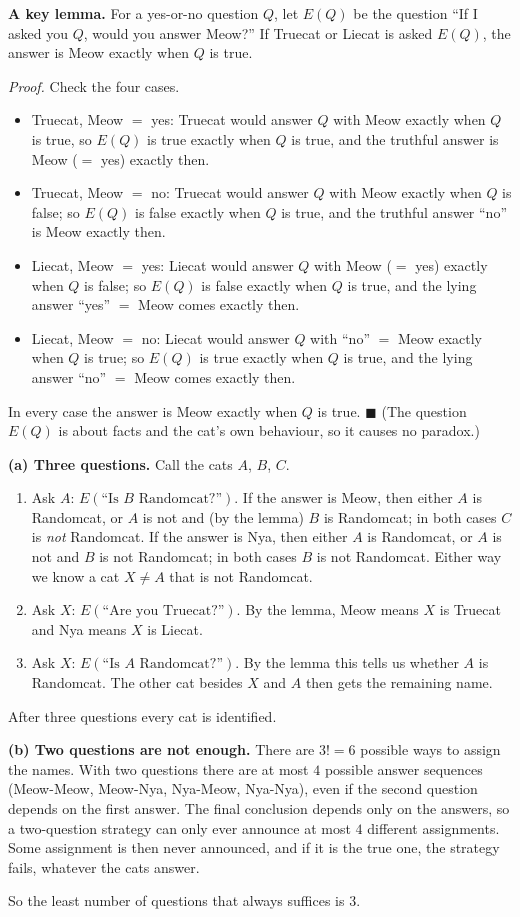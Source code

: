 \textbf{A key lemma.} For a yes-or-no question $Q$, let $E(Q)$ be the question ``If I asked you $Q$, would you answer Meow?'' If Truecat or Liecat is asked $E(Q)$, the answer is Meow exactly when $Q$ is true.

\emph{Proof.} Check the four cases.
\begin{itemize}
\item Truecat, Meow $=$ yes: Truecat would answer $Q$ with Meow exactly when $Q$ is true, so $E(Q)$ is true exactly when $Q$ is true, and the truthful answer is Meow ($=$ yes) exactly then.
\item Truecat, Meow $=$ no: Truecat would answer $Q$ with Meow exactly when $Q$ is false; so $E(Q)$ is false exactly when $Q$ is true, and the truthful answer ``no'' is Meow exactly then.
\item Liecat, Meow $=$ yes: Liecat would answer $Q$ with Meow ($=$ yes) exactly when $Q$ is false; so $E(Q)$ is false exactly when $Q$ is true, and the lying answer ``yes'' $=$ Meow comes exactly then.
\item Liecat, Meow $=$ no: Liecat would answer $Q$ with ``no'' $=$ Meow exactly when $Q$ is true; so $E(Q)$ is true exactly when $Q$ is true, and the lying answer ``no'' $=$ Meow comes exactly then.
\end{itemize}
In every case the answer is Meow exactly when $Q$ is true. $\blacksquare$ (The question $E(Q)$ is about facts and the cat's own behaviour, so it causes no paradox.)

\textbf{(a) Three questions.} Call the cats $A$, $B$, $C$.
\begin{enumerate}
\item Ask $A$: $E(\text{``Is }B\text{ Randomcat?''})$. If the answer is Meow, then either $A$ is Randomcat, or $A$ is not and (by the lemma) $B$ is Randomcat; in both cases $C$ is \emph{not} Randomcat. If the answer is Nya, then either $A$ is Randomcat, or $A$ is not and $B$ is not Randomcat; in both cases $B$ is not Randomcat. Either way we know a cat $X\ne A$ that is not Randomcat.
\item Ask $X$: $E(\text{``Are you Truecat?''})$. By the lemma, Meow means $X$ is Truecat and Nya means $X$ is Liecat.
\item Ask $X$: $E(\text{``Is }A\text{ Randomcat?''})$. By the lemma this tells us whether $A$ is Randomcat. The other cat besides $X$ and $A$ then gets the remaining name.
\end{enumerate}
After three questions every cat is identified.

\textbf{(b) Two questions are not enough.} There are $3!=6$ possible ways to assign the names. With two questions there are at most $4$ possible answer sequences (Meow-Meow, Meow-Nya, Nya-Meow, Nya-Nya), even if the second question depends on the first answer. The final conclusion depends only on the answers, so a two-question strategy can only ever announce at most $4$ different assignments. Some assignment is then never announced, and if it is the true one, the strategy fails, whatever the cats answer.

So the least number of questions that always suffices is $\boxed{3}$.
